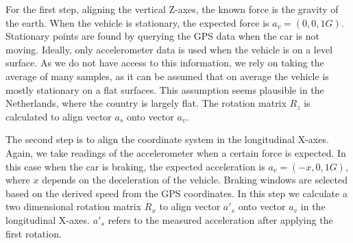 For the first step, aligning the vertical Z-axes, the known force is the gravity of the earth. When the vehicle is stationary, the expected force is $a_v = (0, 0, 1G)$. Stationary points are found by querying the GPS data when the car is not moving. Ideally, only accelerometer data is used when the vehicle is on a level surface. As we do not have access to this information, we rely on taking the average of many samples, as it can be assumed that on average the vehicle is mostly stationary on a flat surfaces. This assumption seems plausible in the Netherlands, where the country is largely flat. The rotation matrix $R_z$ is calculated to align vector $a_s$ onto vector $a_v$.

The second step is to align the coordinate system in the longitudinal X-axes. Again, we take readings of the accelerometer when a certain force is expected. In this case when the car is braking, the expected acceleration is $a_v = (-x, 0, 1G)$, where $x$ depends on the deceleration of the vehicle. Braking windows are selected based on the derived speed from the GPS coordinates. In this step we calculate a two dimensional rotation matrix $R_x$ to align vector $a'_s$ onto vector $a_v$ in the longitudinal X-axes. $a'_s$ refers to the measured acceleration after applying the first rotation.

